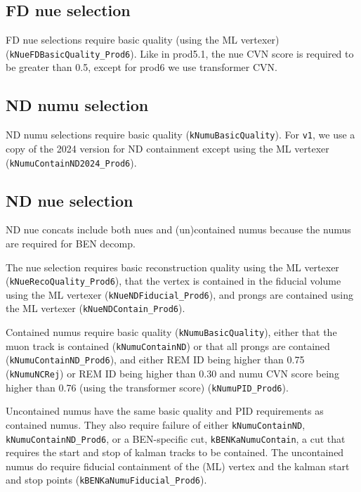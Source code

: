 \documentclass{article}
\begin{document}
\subsection{FD nue selection}
FD nue selections require basic quality (using the ML vertexer) (\texttt{k\-Nue\-FD\-Basic\-Quality\_\-Prod6}).
Like in prod5.1, the nue CVN score is required to be greater than 0.5, except for prod6 we use transformer CVN.

\subsection{ND numu selection}
ND numu selections require basic quality (\texttt{k\-Numu\-Basic\-Quality}). For \texttt{v1}, we use a copy of the 2024 version for ND containment except using the ML vertexer (\texttt{k\-Numu\-Contain\-ND2024\_\-Prod6}).

\subsection{ND nue selection}
ND nue concats include both nues and (un)contained numus because the numus are required for BEN decomp.

The nue selection requires basic reconstruction quality using the ML vertexer (\texttt{k\-Nue\-Reco\-Quality\_\-Prod6}), that the vertex is contained in the fiducial volume using the ML vertexer (\texttt{k\-Nue\-ND\-Fiducial\_\-Prod6}), and prongs are contained using the ML vertexer (\texttt{k\-Nue\-ND\-Contain\_\-Prod6}).


Contained numus require basic quality (\texttt{k\-Numu\-Basic\-Quality}), either that the muon track is contained (\texttt{k\-Numu\-Contain\-ND}) or that all prongs are contained (\texttt{k\-Numu\-Contain\-ND\_\-Prod6}), and either REM ID being higher than 0.75 (\texttt{k\-Numu\-NC\-Rej}) or REM ID being higher than 0.30 and numu CVN score being higher than 0.76 (using the transformer score) (\texttt{k\-Numu\-PID\_\-Prod6}).

Uncontained numus have the same basic quality and PID requirements as contained numus. They also require failure of either \texttt{k\-Numu\-Contain\-ND}, \texttt{k\-Numu\-Contain\-ND\_\-Prod6}, or a BEN-specific cut, \texttt{k\-BEN\-Ka\-Numu\-Contain}, a cut that requires the start and stop of kalman tracks to be contained. The uncontained numus do require fiducial containment of the (ML) vertex and the kalman start and stop points (\texttt{k\-BEN\-Ka\-Numu\-Fiducial\_\-Prod6}).
\end{document}
